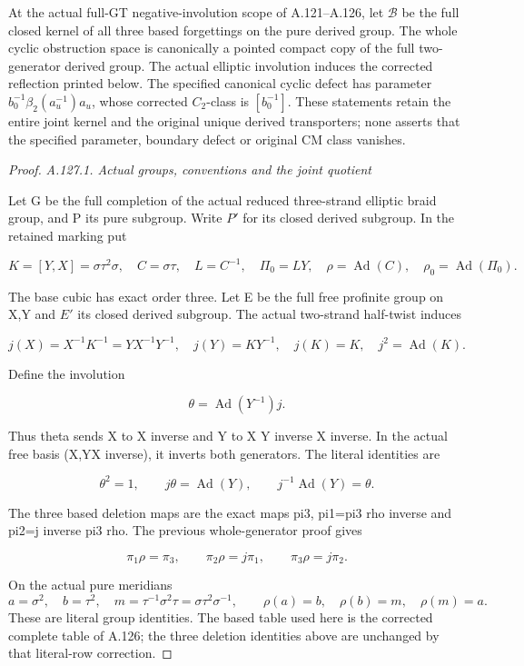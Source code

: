 At the actual full-GT negative-involution scope of A.121--A.126,
let \(\mathcal B\) be the full closed kernel of all three based
forgettings on the pure derived group. The whole cyclic obstruction
space is canonically a pointed compact copy of the full two-generator
derived group. The actual elliptic involution induces the corrected
reflection printed below. The specified canonical cyclic defect has
parameter \(b_0^{-1}\beta_2(a_u^{-1})a_u\), whose corrected
\(C_2\)-class is \([b_0^{-1}]\). These statements retain the entire
joint kernel and the original unique derived transporters; none
asserts that the specified parameter, boundary defect or original CM
class vanishes.
\begin{proof}
\emph{A.127.1. Actual groups, conventions and the joint quotient}

Let G be the full completion of the actual reduced three-strand elliptic braid group, and P its pure subgroup. Write \(P'\) for its closed derived subgroup. In the retained marking put

\[
 K=[Y,X]=\sigma\tau^2\sigma,\quad C=\sigma\tau,\quad
 L=C^{-1},\quad\Pi_0=LY,\quad
 \rho=\operatorname{Ad}(C),\quad \rho_0=\operatorname{Ad}(\Pi_0).
\]

The base cubic has exact order three. Let E be the full free profinite group on X,Y and \(E'\) its closed derived subgroup. The actual two-strand half-twist induces

\[
 j(X)=X^{-1}K^{-1}=YX^{-1}Y^{-1},\quad j(Y)=KY^{-1},\quad
 j(K)=K,\quad j^2=\operatorname{Ad}(K).
\]

Define the involution

\[
 \theta=\operatorname{Ad}(Y^{-1})j.
\]

Thus theta sends X to X inverse and Y to X Y inverse X inverse. In the actual free basis (X,YX inverse), it inverts both generators. The literal identities are

\[
 \theta^2=1,\qquad j\theta=\operatorname{Ad}(Y),\qquad
 j^{-1}\operatorname{Ad}(Y)=\theta.
\tag{A.127.1}
\]

The three based deletion maps are the exact maps pi3, pi1=pi3 rho inverse and pi2=j inverse pi3 rho. The previous whole-generator proof gives

\[
 \pi_1\rho=\pi_3,\qquad \pi_2\rho=j\pi_1,\qquad
 \pi_3\rho=j\pi_2.
\tag{A.127.2}
\]

On the actual pure meridians
\[
 a=\sigma^2,\quad b=\tau^2,\quad
 m=\tau^{-1}\sigma^2\tau=\sigma\tau^2\sigma^{-1},
 \qquad \rho(a)=b,\quad\rho(b)=m,\quad\rho(m)=a.
\]
These are literal group identities. The based table used here is the
corrected complete table of A.126; the three deletion identities above
are unchanged by that literal-row correction.


\end{proof}
